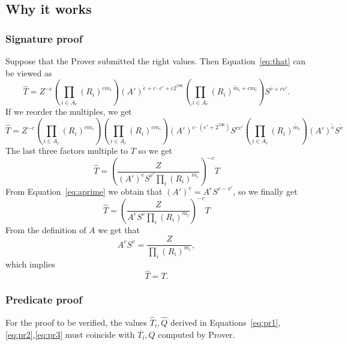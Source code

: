 \documentclass[a4paper]{article}
\begin{document}
\subsection{Why it works}

\subsubsection{Signature proof}

Suppose that the Prover submitted the right values. Then Equation~\eqref{eq:that} can be viewed as
\begin{equation}
\widehat{T} = Z^{-c}\left(\prod_{i \in A_r}(R_i)^{cm_i}\right)
(A')^{ \widetilde{e}+c\cdot e'+c2^{596}} \left(\prod_{i\in A_{\overline{r}}}(R_i)^{ \widetilde{m_i} + cm_i}\right)
S^{\widetilde{v}+cv'}.
\end{equation}
If we reorder the multiples, we get
\begin{equation}
\widehat{T} = Z^{-c}\left(\prod_{i \in A_r}(R_i)^{cm_i}\right)\left(\prod_{i\in A_{\overline{r}}}(R_i)^{ cm_i}\right)
(A')^{ c\cdot (e'+2^{596})}
S^{cv'}
\left(\prod_{i\in A_{\overline{r}}}(R_i)^{ \widetilde{m_i}}\right)(A')^{ \widetilde{e}}
S^{\widetilde{v}}
\end{equation}
The last three factors multiple to $T$ so we get
\begin{equation}
\widehat{T} =\left(\frac{Z}{(A')^{e}S^{v'}\prod_i (R_i)^{m_i}}\right)^{-c}T
\end{equation}
From Equation~\eqref{eq:aprime} we obtain that
$(A')^e =A^e S^{v-v'}$, so we finally get
\begin{equation}
\widehat{T} =\left(\frac{Z}{A^{e}S^{v}\prod_i (R_i)^{m_i}}\right)^{-c}T
\end{equation} 
From the definition of $A$ we get that
\begin{equation}
A^e S^v = \frac{Z}{\prod_i (R_i)^{m_i}},
\end{equation}
which implies
$$
\widehat{T} = T.
$$


\subsubsection{Predicate proof}

For the proof to be verified, the values $\widehat{T}_i,\widehat{Q}$ derived in Equations~\eqref{eq:pr1},\eqref{eq:pr2},\eqref{eq:pr3} must coincide with $\overline{T_i},Q$ computed by Prover. 
\end{document}
